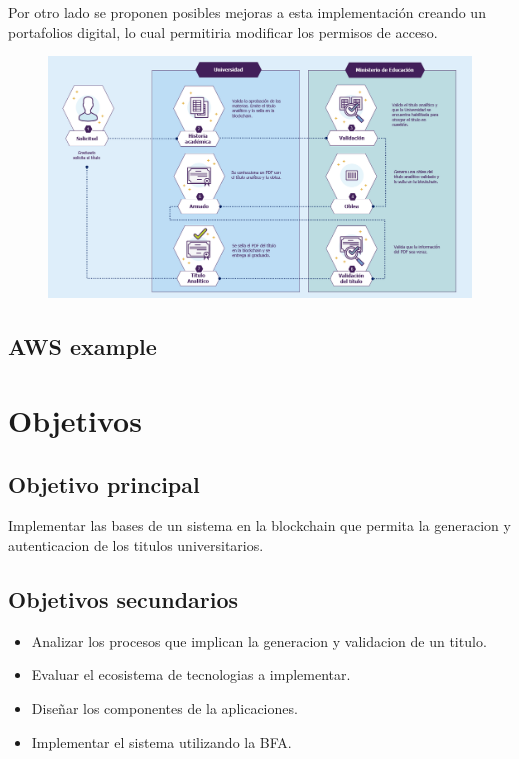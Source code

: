 \documentclass[11pt,a4paper]{article}
\begin{document}
        Por otro lado se proponen posibles mejoras a esta implementación creando un portafolios digital, lo cual 
        permitiria modificar los permisos de acceso.

        \begin{figure}
            \centering
            \includegraphics[width=\textwidth]{Img/cuadro_problematica.png}
            \caption{}
            \label{fig:cuadro_problematica}
        \end{figure}

        \subsection{AWS example}
    \section{Objetivos}

        \subsection{Objetivo principal}

        Implementar las bases de un sistema en la blockchain que permita la generacion 
        y autenticacion de los titulos universitarios. 
        
        \subsection{Objetivos secundarios}

        \begin{itemize}
            \item Analizar los procesos que implican la generacion y validacion de un titulo.
            \item Evaluar el ecosistema de tecnologias a implementar.
            \item Diseñar los componentes de la aplicaciones.
            \item Implementar el sistema utilizando la BFA. 
        \end{itemize}
\end{document}
